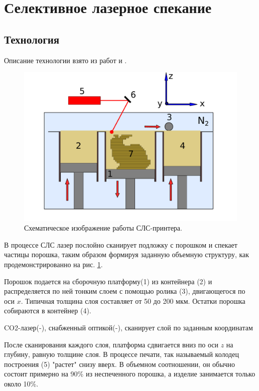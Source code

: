 \section{Селективное лазерное спекание}


\subsection{Технология}

Описание технологии взято из работ \cite{sls-material} и \cite{ageing}.

\begin{figure}[ht]
    \centering
    \includegraphics[width=\linewidth]{fig/sls-2d.pdf}
    \caption{Схематическое изображение работы СЛС-принтера.}
    \label{fig:printer}
\end{figure}


В процессе СЛС лазер послойно сканирует подложку с порошком и спекает частицы порошка, таким образом формируя заданную объемную структуру, как продемонстрированно на рис. \ref{fig:printer}. 







Порошок подается на сборочную платформу(1) из контейнера (2) и распределяется по ней тонким слоем с помощью ролика (3), двигающегося по оси $x$. Типичная толщина слоя составляет от 50 до 200 мкм. Остатки порошка собираются в контейнер (4).

CO2-лазер(-), снабженный оптикой(-), сканирует слой по заданным координатам

После сканирования каждого слоя, платформа сдвигается вниз по оси $z$ на глубину, равную толщине слоя. В процессе печати, так называемый колодец построения (5) "растет" снизу вверх. В объемном соотношении, он обычно состоит примерно на 90\% из неспеченного порошка, а изделие занимается только около 10\%. 

